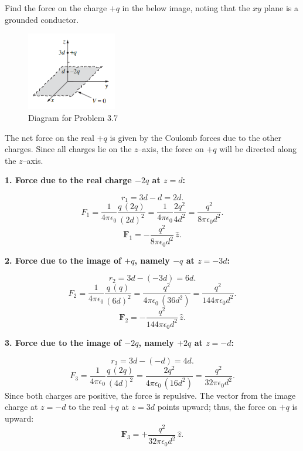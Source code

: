 \begin{hwkProblem}{3.7}{}

	Find the force on the charge \( +q \) in the below image, noting that the \( xy \) plane is a grounded conductor.
	\begin{figure}[H]
		\begin{center}
			\includegraphics[width=0.35\textwidth]{./images/p3_7.png}
		\end{center}
		\caption{Diagram for Problem 3.7}\label{fig:p3_7}
	\end{figure}

	\hwkSol{}
	
	The net force on the real \(+q\) is given by the Coulomb forces due to the other charges. Since all charges lie on the \(z\)–axis, the force on \(+q\) will be directed along the \(z\)–axis.

	\textbf{1. Force due to the real charge \(-2q\) at \(z=d\):}  

	\[
	r_{1} = 3d - d = 2d.
	\]
	\[
	F_{1} = \frac{1}{4\pi\epsilon_0}\frac{q\,(2q)}{(2d)^2} = \frac{1}{4\pi\epsilon_0}\frac{2q^2}{4d^2} = \frac{q^2}{8\pi\epsilon_0 d^2}.
	\]
	\[
	\mathbf{F}_1 = -\frac{q^2}{8\pi\epsilon_0 d^2}\,\hat{z}.
	\]

	\textbf{2. Force due to the image of \(+q\), namely \(-q\) at \(z=-3d\):}  

	\[
	r_{2} = 3d - (-3d) = 6d.
	\]
	\[
	F_{2} = \frac{1}{4\pi\epsilon_0}\frac{q\,(q)}{(6d)^2} = \frac{q^2}{4\pi\epsilon_0\,(36d^2)} = \frac{q^2}{144\pi\epsilon_0 d^2}.
	\]
	\[
	\mathbf{F}_2 = -\frac{q^2}{144\pi\epsilon_0 d^2}\,\hat{z}.
	\]

	\textbf{3. Force due to the image of \(-2q\), namely \(+2q\) at \(z=-d\):}  

	\[
	r_{3} = 3d - (-d) = 4d.
	\]
	\[
	F_{3} = \frac{1}{4\pi\epsilon_0}\frac{q\,(2q)}{(4d)^2} = \frac{2q^2}{4\pi\epsilon_0\,(16d^2)} = \frac{q^2}{32\pi\epsilon_0 d^2}.
	\]
	Since both charges are positive, the force is repulsive. The vector from the image charge at \(z=-d\) to the real \(+q\) at \(z=3d\) points upward; thus, the force on \(+q\) is upward:
	\[
	\mathbf{F}_3 = +\frac{q^2}{32\pi\epsilon_0 d^2}\,\hat{z}.
	\]


\end{hwkProblem}
